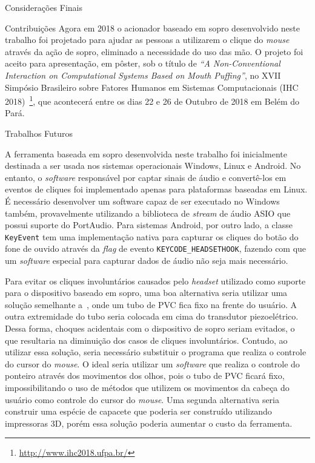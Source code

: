 \begin{chapter}{Considerações Finais}
\begin{section}{Contribuições}
Agora em 2018 o acionador baseado em sopro desenvolvido neste trabalho foi
projetado para ajudar as pessoas a utilizarem o clique do \textit{mouse} através
da ação de sopro, eliminado a necessidade do uso das mão. O
projeto foi aceito para apresentação, em pôster, sob o título de \textit{``A
Non-Conventional Interaction on Computational Systems
Based on Mouth Puffing''},  no XVII Simpósio Brasileiro
sobre Fatores Humanos em Sistemas Computacionais (IHC
2018)~\footnote{\url{http://www.ihc2018.ufpa.br/}}, que acontecerá entre os dias
22 e 26 de Outubro de 2018 em Belém do Pará.

\end{section}



\begin{section}{Trabalhos Futuros}

A ferramenta baseada em sopro desenvolvida neste trabalho foi inicialmente
destinada a ser usada nos sistemas operacionais Windows, Linux e Android. No
entanto, o \textit{software} responsável por captar sinais de áudio e
convertê-los em eventos de cliques foi implementado apenas para plataformas
baseadas em Linux. É necessário desenvolver um software capaz de ser executado
no Windows também, provavelmente utilizando a biblioteca de \textit{stream} de
áudio ASIO que possui suporte do PortAudio. Para sistemas Android, por outro
lado, a classe \texttt{KeyEvent} tem uma implementação nativa para capturar os
cliques do botão do fone de ouvido através da \textit{flag} de evento
\texttt{KEYCODE\_HEADSETHOOK}, fazendo com que um \textit{software} especial
para capturar dados de áudio não seja mais necessário.

Para evitar os cliques involuntários causados pelo \textit{headset} utilizado
como suporte para o dispositivo baseado em sopro, uma boa alternativa seria
utilizar uma solução semelhante a~\cite{ok}, onde um tubo de PVC fica fixo na
frente do usuário. A outra extremidade do tubo seria colocada em cima do
transdutor piezoelétrico. Dessa forma, choques acidentais com o dispositivo de
sopro seriam evitados, o que resultaria na diminuição dos casos de cliques
involuntários. Contudo, ao utilizar essa solução, seria necessário substituir o
programa que realiza o controle do cursor do \textit{mouse}. O ideal seria
utilizar um \textit{software} que realiza o controle do ponteiro através dos
movimentos dos olhos, pois o tubo de PVC ficará fixo, impossibilitando o uso de
métodos que utilizem os movimentos da cabeça do usuário como controle do cursor
do \textit{mouse}. Uma segunda alternativa seria construir uma espécie de
capacete que poderia ser construído utilizando impressoras 3D, porém essa 
solução poderia aumentar o custo da ferramenta.  


\end{section}
\end{chapter}

